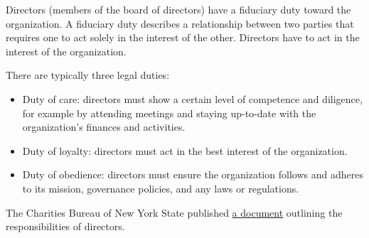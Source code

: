 \begin{kaobox}[frametitle=Director responsibilities]

Directors (members of the board of directors) have a fiduciary duty toward the organization.  A fiduciary duty describes a relationship between two parties that requires one to act solely in the interest of the other.  Directors have to act in the interest of the organization.

There are typically three legal duties:

\begin{itemize}

\item Duty of care: directors must show a certain level of competence and diligence, for example by attending meetings and staying up-to-date with the organization's finances and activities.

\item Duty of loyalty: directors must act in the best interest of the organization.

\item Duty of obedience: directors must ensure the organization follows and adheres to its mission, governance policies, and any laws or regulations.

\end{itemize}

The Charities Bureau of New York State published \href{https://www.charitiesnys.com/pdfs/Right-From-the-Start.pdf}{a document} outlining the responsibilities of directors.

\end{kaobox}

